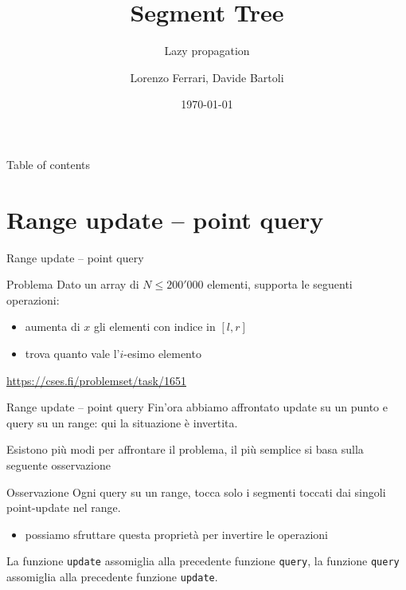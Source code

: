 \documentclass[compress]{beamer}
\title{Segment Tree}
\subtitle{Lazy propagation}
\author{Lorenzo Ferrari, Davide Bartoli}
\date{\today}
\begin{document}
\begin{frame}
    \maketitle
\end{frame}

\begin{frame}{Table of contents}
  \tableofcontents
\end{frame}

\section{Range update -- point query}
\begin{frame}{Range update -- point query}
    \begin{exampleblock}{Problema}
        Dato un array di $N \leq 200'000$ elementi, supporta le seguenti operazioni:
        \begin{itemize}
            \item aumenta di $x$ gli elementi con indice in $[l, r]$
            \item trova quanto vale l'$i$-esimo elemento
        \end{itemize}
    \end{exampleblock}
    \small{\underline{\url{https://cses.fi/problemset/task/1651}}}
\end{frame}

\begin{frame}{Range update -- point query}
    Fin'ora abbiamo affrontato update su un punto e query su un range: qui la situazione \`e invertita.

    \pause
    Esistono pi\`u modi per affrontare il problema, il pi\`u semplice si basa sulla seguente osservazione
    \begin{block}{Osservazione}
        Ogni query su un range, tocca solo i segmenti toccati dai singoli point-update nel range.
        \pause
        \begin{itemize}
            \item possiamo sfruttare questa propriet\`a per invertire le operazioni
        \end{itemize}
    \end{block}
    \pause
    La funzione \texttt{update} assomiglia alla precedente funzione \texttt{query}, la funzione \texttt{query} assomiglia alla precedente funzione \texttt{update}.
\end{frame}
\end{document}
